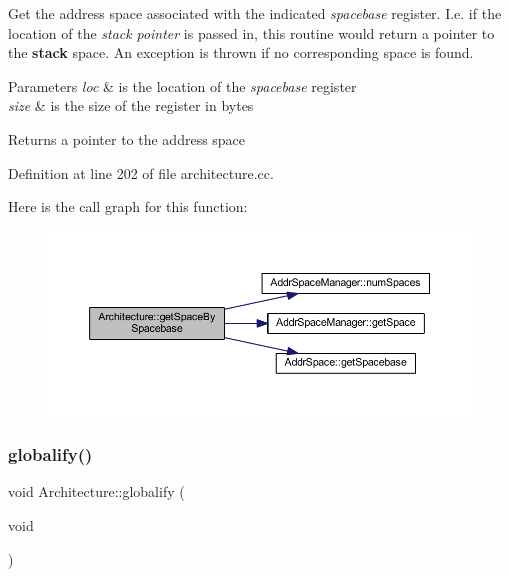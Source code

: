 Get the address space associated with the indicated {\itshape spacebase} register. I.\+e. if the location of the {\itshape stack} {\itshape pointer} is passed in, this routine would return a pointer to the {\bfseries{stack}} space. An exception is thrown if no corresponding space is found. 
\begin{DoxyParams}{Parameters}
{\em loc} & is the location of the {\itshape spacebase} register \\
\hline
{\em size} & is the size of the register in bytes \\
\hline
\end{DoxyParams}
\begin{DoxyReturn}{Returns}
a pointer to the address space 
\end{DoxyReturn}


Definition at line 202 of file architecture.\+cc.

Here is the call graph for this function\+:
\nopagebreak
\begin{figure}[H]
\begin{center}
\leavevmode
\includegraphics[width=350pt]{class_architecture_a6cef69bf3d546ca1012fcf5c017f7f3a_cgraph}
\end{center}
\end{figure}
\mbox{\label{class_architecture_a726878f225eebebb51d4e618f4d53631}} 
\subsubsection{\texorpdfstring{globalify()}{globalify()}}
{\footnotesize\ttfamily void Architecture\+::globalify (\begin{DoxyParamCaption}\item[{void}]{ }\end{DoxyParamCaption})}



